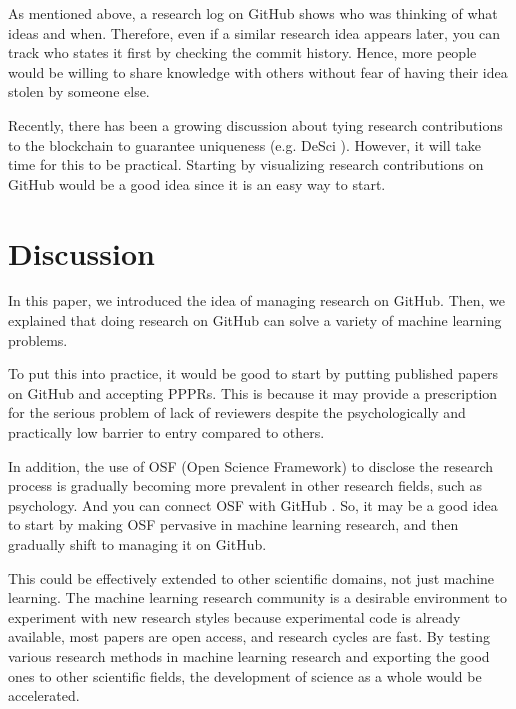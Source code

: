 \documentclass{article}
\begin{document}
As mentioned above, a research log on GitHub shows who was thinking of what ideas and when. Therefore, even if a similar research idea appears later, you can track who states it first by checking the commit history. Hence, more people would be willing to share knowledge with others without fear of having their idea stolen by someone else. 

Recently, there has been a growing discussion about tying research contributions to the blockchain to guarantee uniqueness (e.g. DeSci \cite{hamburg2021call}). However, it will take time for this to be practical. Starting by visualizing research contributions on GitHub would be a good idea since it is an easy way to start.

\section{Discussion}
In this paper, we introduced the idea of managing research on GitHub. Then, we explained that doing research on GitHub can solve a variety of machine learning problems. 

To put this into practice, it would be good to start by putting published papers on GitHub and accepting PPPRs. This is because it may provide a prescription for the serious problem of lack of reviewers despite the psychologically and practically low barrier to entry compared to others.

In addition, the use of OSF (Open Science Framework) \cite{foster2017open} to disclose the research process is gradually becoming more prevalent in other research fields, such as psychology. And you can connect OSF with GitHub \cite{osfgithub}. So, it may be a good idea to start by making OSF pervasive in machine learning research, and then gradually shift to managing it on GitHub.

This could be effectively extended to other scientific domains, not just machine learning. The machine learning research community is a desirable environment to experiment with new research styles because experimental code is already available, most papers are open access, and research cycles are fast. By testing various research methods in machine learning research and exporting the good ones to other scientific fields, the development of science as a whole would be accelerated.



\end{document}
